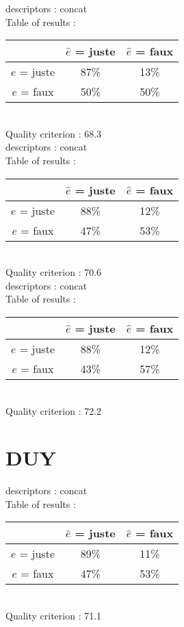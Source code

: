 descriptors : concat \\
Table of results : \\
\begin{tabular}{|c|c|c|}
\hline				& $\hat{e}$ = juste & $\hat{e}$ = faux \\
\hline  $e$ = juste	&     87\%			&     13\%		\\
\hline  $e$ = faux	&     50\%			&     50\%		\\
\hline
\end{tabular}\\
Quality criterion :   68.3 \\

descriptors : concat \\
Table of results : \\
\begin{tabular}{|c|c|c|}
\hline				& $\hat{e}$ = juste & $\hat{e}$ = faux \\
\hline  $e$ = juste	&     88\%			&     12\%		\\
\hline  $e$ = faux	&     47\%			&     53\%		\\
\hline
\end{tabular}\\
Quality criterion :   70.6 \\

descriptors : concat \\
Table of results : \\
\begin{tabular}{|c|c|c|}
\hline				& $\hat{e}$ = juste & $\hat{e}$ = faux \\
\hline  $e$ = juste	&     88\%			&     12\%		\\
\hline  $e$ = faux	&     43\%			&     57\%		\\
\hline
\end{tabular}\\
Quality criterion :   72.2 \\

\section*{DUY}
descriptors : concat \\
Table of results : \\
\begin{tabular}{|c|c|c|}
\hline				& $\hat{e}$ = juste & $\hat{e}$ = faux \\
\hline  $e$ = juste	&     89\%			&     11\%		\\
\hline  $e$ = faux	&     47\%			&     53\%		\\
\hline
\end{tabular}\\
Quality criterion :   71.1 \\


